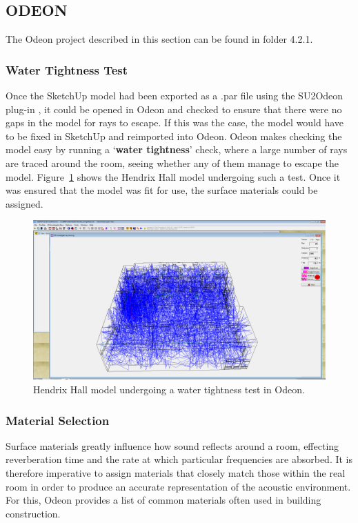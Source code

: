 \documentclass[../../main.tex]{subfiles}
\begin{document}
\subsection{ODEON}

	The Odeon project described in this section can be found in folder 4.2.1.

	\label{odeon}
	\subsubsection{Water Tightness Test}
		Once the SketchUp model had been exported as a .par file using the SU2Odeon plug-in \cite{SU2Odeon}, it could be opened in Odeon and checked to ensure that there were no gaps in the model for rays to escape. If this was the case, the model would have to be fixed in SketchUp and reimported into Odeon. Odeon makes checking the model easy by running a `\textbf{water tightness}' check, where a large number of rays are traced around the room, seeing whether any of them manage to escape the model. Figure~\ref{watertight} shows the Hendrix Hall model undergoing such a test. Once it was ensured that the model was fit for use, the surface materials could be assigned.

		\begin{figure}[H]
			\centerline{\includegraphics[scale = 0.3]{Sections/Implementation/Odeon/images/OdeonRays/waterTight2.PNG}}
			\caption{Hendrix Hall model undergoing a water tightness test in Odeon.}
			\label{watertight}
		\end{figure}

	\subsubsection{Material Selection}
	\label{odeon:materials}
		Surface materials greatly influence how sound reflects around a room, effecting reverberation time and the rate at which particular frequencies are absorbed. It is therefore imperative to assign materials that closely match those within the real room in order to produce an accurate representation of the acoustic environment. For this, Odeon provides a list of common materials often used in building construction.
\end{document}
